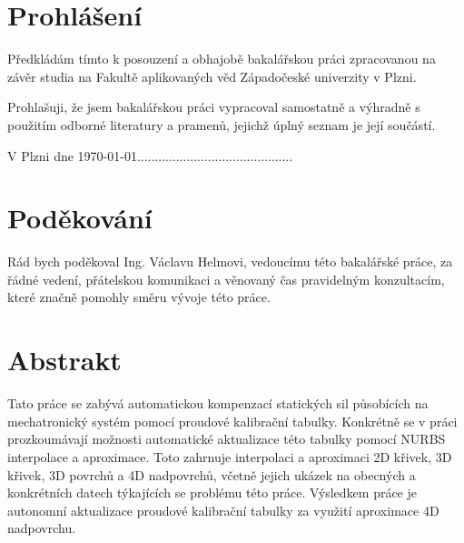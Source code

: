 

\vspace*{\fill}
{\begin{center}
\end{center}}
\vspace*{\fill}
\newpage

\vspace*{\fill}
\section*{Prohlášení}
Předkládám tímto k posouzení a obhajobě bakalářskou práci zpracovanou
na závěr studia na Fakultě aplikovaných věd Západočeské univerzity v Plzni.
\par
Prohlašuji, že jsem bakalářskou práci vypracoval samostatně a výhradně s použitím odborné literatury
a pramenů, jejichž úplný seznam je její součástí.
\par
\vspace{5mm}
V Plzni dne \today \hfill ............................................
\section*{Poděkování}
Rád bych poděkoval Ing. Václavu Helmovi, vedoucímu této bakalářské práce, za řádné vedení, přátelskou komunikaci a věnovaný čas pravidelným konzultacím, které značně pomohly směru vývoje této práce.
\vspace*{\fill}
\newpage
\vspace*{\fill}
\section*{Abstrakt}
Tato práce se zabývá automatickou kompenzací statických sil působících na mechatronický systém pomocí proudové kalibrační tabulky. Konkrétně se v práci prozkoumávají možnosti automatické aktualizace této tabulky pomocí NURBS interpolace a aproximace. Toto zahrnuje interpolaci a aproximaci 2D křivek, 3D křivek, 3D povrchů a 4D nadpovrchů, včetně jejich ukázek na obecných a konkrétních datech týkajících se problému této práce. Výsledkem práce je autonomní aktualizace proudové kalibrační tabulky za využití aproximace 4D nadpovrchu.
\section*{}

